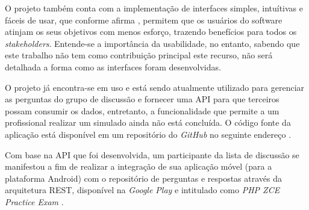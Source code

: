 O projeto também conta com a implementação de interfaces simples, intuítivas e
fáceis de usar, que conforme afirma , permitem
que os usuários do software atinjam os seus objetivos com menos esforço,
trazendo benefícios para todos os \textit{stakeholders}. Entende-se a
importância da usabilidade, no entanto, sabendo que este trabalho não tem como
contribuição principal este recurso, não será detalhada a forma como as
interfaces foram desenvolvidas.

O projeto já encontra-se em uso e está sendo atualmente utilizado para 
gerenciar as perguntas do grupo de discussão e fornecer uma \ac{API} para que 
terceiros possam consumir os dados, entretanto, a funcionalidade que permite a
um profissional realizar um simulado ainda não está concluída. O código fonte da
aplicação está disponível em um repositório do \textit{GitHub} no seguinte
endereço \cite{githubZCPE}.

Com base na \acs{API} que foi desenvolvida, um participante da lista de
discussão se manifestou a fim de realizar a integração de sua aplicação móvel (para a
plataforma Android) com o repositório de perguntas e respostas através da arquitetura
\ac{REST}, disponível na \textit{Google Play} e intitulado como \textit{PHP ZCE
Practice Exam} \cite{googlePlayPHPZCEPracticeExam}.




